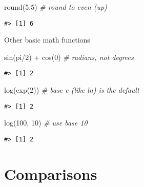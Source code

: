 \documentclass[
]{book}
\newenvironment{Shaded}{\begin{snugshade}}{\end{snugshade}}
\newcommand{\CommentTok}[1]{\textcolor[rgb]{0.56,0.35,0.01}{\textit{#1}}}
\newcommand{\DecValTok}[1]{\textcolor[rgb]{0.00,0.00,0.81}{#1}}
\newcommand{\FloatTok}[1]{\textcolor[rgb]{0.00,0.00,0.81}{#1}}
\newcommand{\FunctionTok}[1]{\textcolor[rgb]{0.00,0.00,0.00}{#1}}
\newcommand{\NormalTok}[1]{#1}
\newcommand{\SpecialCharTok}[1]{\textcolor[rgb]{0.00,0.00,0.00}{#1}}
\begin{document}
\begin{Shaded}
\begin{Highlighting}[]
\FunctionTok{round}\NormalTok{(}\FloatTok{5.5}\NormalTok{) }\CommentTok{\# round to even (up)}
\end{Highlighting}
\end{Shaded}

\begin{verbatim}
#> [1] 6
\end{verbatim}

Other basic math functions

\begin{Shaded}
\begin{Highlighting}[]
\FunctionTok{sin}\NormalTok{(pi}\SpecialCharTok{/}\DecValTok{2}\NormalTok{) }\SpecialCharTok{+} \FunctionTok{cos}\NormalTok{(}\DecValTok{0}\NormalTok{) }\CommentTok{\# radians, not degrees}
\end{Highlighting}
\end{Shaded}

\begin{verbatim}
#> [1] 2
\end{verbatim}

\begin{Shaded}
\begin{Highlighting}[]
\FunctionTok{log}\NormalTok{(}\FunctionTok{exp}\NormalTok{(}\DecValTok{2}\NormalTok{)) }\CommentTok{\# base e (like ln) is the default}
\end{Highlighting}
\end{Shaded}

\begin{verbatim}
#> [1] 2
\end{verbatim}

\begin{Shaded}
\begin{Highlighting}[]
\FunctionTok{log}\NormalTok{(}\DecValTok{100}\NormalTok{, }\DecValTok{10}\NormalTok{) }\CommentTok{\# use base 10}
\end{Highlighting}
\end{Shaded}

\begin{verbatim}
#> [1] 2
\end{verbatim}

\hypertarget{comparisons}{%
\section{Comparisons}\label{comparisons}}
\end{document}
